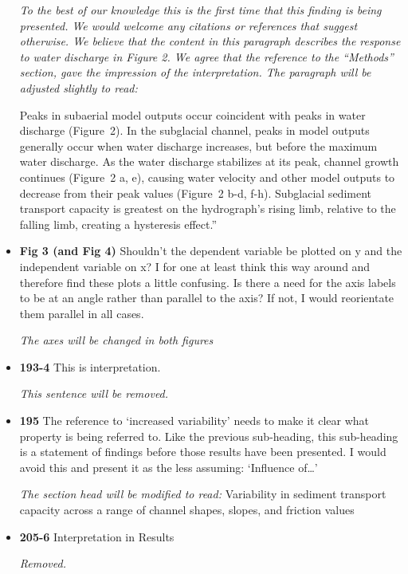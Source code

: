 \documentclass[11pt]{article}
\begin{document}
\begin{itemize}
  \textit{ To the best of our knowledge this is the first time that this finding is being presented.
    We would welcome any citations or references that suggest otherwise. We believe that the content in this paragraph describes the response to water discharge in Figure 2. We agree that the reference to the ``Methods'' section, gave the impression of the interpretation. The paragraph will be adjusted slightly to read:}


    Peaks in subaerial model outputs occur coincident with peaks in water discharge (Figure~2).
    In the subglacial channel, peaks in model outputs generally occur when water discharge increases, but before the maximum water discharge.
    As the water discharge stabilizes at its peak, channel growth continues (Figure~2 a, e), causing water velocity and other model outputs to decrease from their peak values (Figure~2 b-d, f-h).
    Subglacial sediment transport capacity is greatest on the hydrograph's rising limb, relative to the falling limb, creating a hysteresis effect.''
  
  
\item \textbf{Fig 3 (and Fig 4)} Shouldn’t the dependent variable be plotted on y and the independent
  variable on x? I for one at least think this way around and therefore find
  these plots a little confusing.
  Is there a need for the axis labels to be at an angle rather than parallel to
  the axis? If not, I would reorientate them parallel in all cases.

  \textit{The axes will be changed in both figures}
  
\item \textbf{193-4} This is interpretation.

  \textit{This sentence will be removed.}
  
\item \textbf{195} The reference to ‘increased variability’ needs to make it clear what property
  is being referred to. Like the previous sub-heading, this sub-heading is a
  statement of findings before those results have been presented. I would
  avoid this and present it as the less assuming: ‘Influence of…’


  \textit{The section head will be modified to read:} Variability in sediment transport capacity across a range of channel shapes, slopes, and friction values

\item \textbf{205-6} Interpretation in Results

  \textit{Removed.}
  

\end{itemize}
\end{document}
